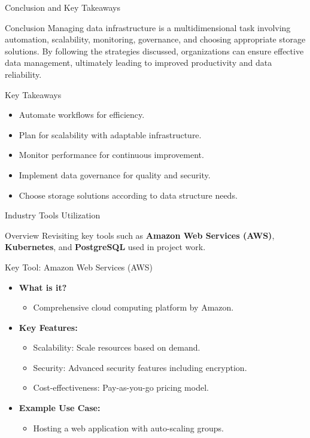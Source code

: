 \documentclass[aspectratio=169]{beamer}
\begin{document}
\begin{frame}[fragile]{Conclusion and Key Takeaways}
  \begin{block}{Conclusion}
    Managing data infrastructure is a multidimensional task involving automation, scalability, monitoring, governance, and choosing appropriate storage solutions. By following the strategies discussed, organizations can ensure effective data management, ultimately leading to improved productivity and data reliability.
  \end{block}

  \begin{block}{Key Takeaways}
    \begin{itemize}
      \item Automate workflows for efficiency.
      \item Plan for scalability with adaptable infrastructure.
      \item Monitor performance for continuous improvement.
      \item Implement data governance for quality and security.
      \item Choose storage solutions according to data structure needs.
    \end{itemize}
  \end{block}
\end{frame}

\begin{frame}{Industry Tools Utilization}
  \begin{block}{Overview}
    Revisiting key tools such as \textbf{Amazon Web Services (AWS)}, \textbf{Kubernetes}, and \textbf{PostgreSQL} used in project work.
  \end{block}
\end{frame}

\begin{frame}{Key Tool: Amazon Web Services (AWS)}
  \begin{itemize}
    \item \textbf{What is it?} 
      \begin{itemize}
        \item Comprehensive cloud computing platform by Amazon.
      \end{itemize}
    \item \textbf{Key Features:}
      \begin{itemize}
        \item Scalability: Scale resources based on demand.
        \item Security: Advanced security features including encryption.
        \item Cost-effectiveness: Pay-as-you-go pricing model.
      \end{itemize}
    \item \textbf{Example Use Case:}
      \begin{itemize}
        \item Hosting a web application with auto-scaling groups.
      \end{itemize}
  \end{itemize}
\end{frame}
\end{document}
